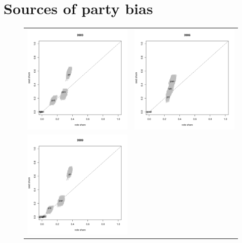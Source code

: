 \documentclass[letter,12pt]{article}
\begin{document}

\section{Sources of party bias}

\begin{figure}
\begin{center}
\begin{tabular}{cc}
    \includegraphics[width=.48\columnwidth]{vs2003.pdf} &
    \includegraphics[width=.48\columnwidth]{vs2006.pdf} \\
    \includegraphics[width=.48\columnwidth]{vs2009.pdf} &

\end{tabular}
\end{center}
\end{figure}
\end{document}
